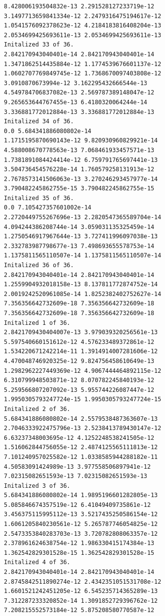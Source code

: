 \documentclass[11pt]{article}
\begin{document}
\begin{Verbatim}[commandchars=\\\{\}]
8.428006193504832e-13 2.291528127233719e-12
3.1497713659841334e-12 2.2479316475194617e-12
1.0541576092378623e-12 4.2184183816408204e-13
2.0534699425693611e-13 2.0534699425693611e-13
Initalized 33 of 36.
2.842170943040401e-14 2.842170943040401e-14
1.3471862514435884e-12 1.1774539676601137e-12
1.0602707769849745e-12 1.7368670097403808e-12
3.0910870673994e-12 3.162295432666544e-13
4.549784706837082e-13 2.569787389148047e-12
9.265653644767455e-13 6.4180320064244e-14
3.336881772012884e-13 3.336881772012884e-13
Initalized 34 of 36.
0.0 5.684341886080802e-14
1.1715195870690143e-12 9.820930960829921e-14
4.588008670778563e-13 7.068461933457571e-13
1.7381891084424414e-12 6.759791765697441e-13
3.504736454576228e-14 1.760579258131913e-12
2.7678573141506063e-13 3.270246293457977e-14
3.790482245862755e-15 3.790482245862755e-15
Initalized 35 of 36.
0.0 7.105427357601002e-14
2.2720449755267696e-13 2.2820547365589704e-14
4.094244386208744e-14 3.059031135325459e-14
1.2750546917967644e-13 3.727411996097038e-13
2.332783987798677e-13 7.498693655578753e-14
1.1375811565110507e-14 1.1375811565110507e-14
Initalized 36 of 36.
2.842170943040401e-14 2.842170943040401e-14
1.2559904932018158e-13 8.137811772874752e-14
2.0019242520961085e-14 1.8252382402752627e-14
7.356356642732609e-18 7.356356642732609e-18
7.356356642732609e-18 7.356356642732609e-18
Initalized 1 of 36.
2.8421709430404007e-13 3.979039320256561e-13
5.597540660151612e-12 4.576233489372861e-12
1.534220671242214e-11 1.3914914007281606e-12
4.470048746920325e-12 9.824756458610649e-13
1.2982962227449369e-12 4.9067444464892115e-12
6.310799948503871e-12 8.070782245840193e-12
5.259566807207092e-13 5.955744226087447e-12
1.9950305793247724e-15 1.9950305793247724e-15
Initalized 2 of 36.
5.684341886080802e-14 2.5579538487363607e-13
2.7046333922475796e-13 2.5238413789430147e-12
6.63237348003695e-12 4.1252248538241505e-12
1.516062844756055e-12 2.4874125565111813e-12
7.101240957025582e-12 1.0338585944288182e-11
4.50583091424989e-13 3.977558506897941e-12
7.02315082651593e-13 7.02315082651593e-13
Initalized 3 of 36.
5.684341886080802e-14 1.9895196601282805e-13
5.085846674357519e-12 6.41049409735861e-12
3.456375115995112e-13 3.5217435250586154e-12
1.6061205840230561e-12 5.265787746054825e-12
2.5473353840283703e-13 3.720782808063357e-12
2.378961624638754e-12 1.986330415174384e-13
1.362542829301528e-15 1.362542829301528e-15
Initalized 4 of 36.
2.842170943040401e-14 2.842170943040401e-14
2.8745842511890274e-12 2.4342351051531708e-12
1.6601521242451205e-12 6.545235714365289e-13
7.312287233320852e-14 1.3091852729396762e-12
7.208215552573184e-12 5.875208580770587e-12

\end{Verbatim}
\end{document}

